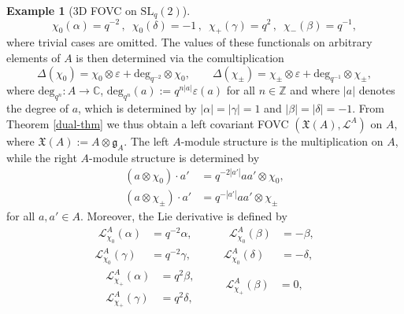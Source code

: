 \documentclass{article}
\theoremstyle{definition}
\newtheorem{example}[thm]{Example}
\begin{document}
\begin{example}[3D FOVC on $\mathrm{SL}_q(2)$]
		$$
		\chi_0(\alpha)=q^{-2}\,,\,\,\,\chi_0(\delta)=-1\,,\,\,\,\chi_+(\gamma)=q^{2}\,,\,\,\,\chi_-(\beta)=q^{-1},
		$$
		where trivial cases are omitted. The values of these functionals on arbitrary elements of $A$ is then determined via the comultiplication
		\begin{equation}
			\Delta(\chi_0)
			=\chi_0\otimes\varepsilon
			+\mathrm{deg}_{q^{-2}}\otimes\chi_0,\qquad
			\Delta(\chi_\pm)
			=\chi_\pm\otimes\varepsilon
			+\mathrm{deg}_{q^{-1}}\otimes\chi_\pm,
		\end{equation}
		where $\mathrm{deg}_{q^n}\colon A\to\mathbb{C}$, $\mathrm{deg}_{q^n}(a):=q^{n|a|}\varepsilon(a)$ for all $n\in\mathbb{Z}$ and where $|a|$ denotes the degree of $a$, which is determined by $|\alpha|=|\gamma|=1$ and $|\beta|=|\delta|=-1$. From Theorem \ref{dual-thm} we thus obtain a left covariant FOVC $(\mathfrak{X}(A),\mathscr{L}^A)$ on $A$, where $\mathfrak{X}(A):=A\otimes\mathfrak{g}_A$.
		The left $A$-module structure is the multiplication on $A$, while the right $A$-module structure is determined by
		\begin{equation}
			\begin{split}
				(a\otimes\chi_0)\cdot a'&=q^{-2|a'|}aa'\otimes \chi_0,\\
				(a\otimes\chi_\pm)\cdot a'&=q^{-|a'|}aa'\otimes\chi_\pm
			\end{split}
		\end{equation}
		for all $a,a'\in A$. Moreover, the Lie derivative is defined by
		\begin{equation}\label{eq:chi0}
			\begin{split}
				\,\,\mathscr{L}^A_{\chi_0}(\alpha)&=q^{-2}\alpha,\\
				\mathscr{L}^A_{\chi_0}(\gamma)&=q^{-2}\gamma,
			\end{split}\qquad
			\begin{split}
				\,\,\,   \mathscr{L}^A_{\chi_0}(\beta)&=-\beta,\\
				\mathscr{L}^A_{\chi_0}(\delta)&=-\delta,
			\end{split}
		\end{equation}
		\begin{equation}
			\begin{split}
				\mathscr{L}^A_{\chi_+}(\alpha)&=q^{2}\beta,\\
				\mathscr{L}^A_{\chi_+}(\gamma)&=q^{2}\delta,
			\end{split}\qquad
			\begin{split}
				\mathscr{L}^A_{\chi_+}(\beta)&=0,\\

\end{split}
\end{equation}
\end{example}
\end{document}
